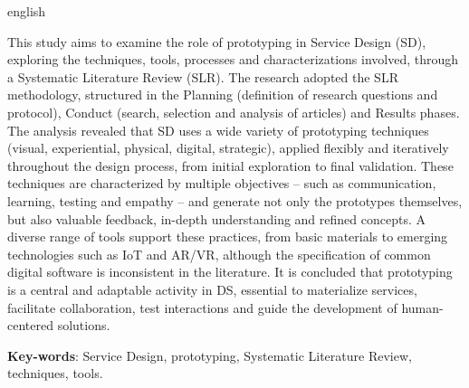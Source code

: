 \begin{resumo}[Abstract]
 \begin{otherlanguage*}{english}
 	
This study aims to examine the role of prototyping in Service Design (SD), exploring the techniques, tools, processes and characterizations involved, through a Systematic Literature Review (SLR). The research adopted the SLR methodology, structured in the Planning (definition of research questions and protocol), Conduct (search, selection and analysis of articles) and Results phases. The analysis revealed that SD uses a wide variety of prototyping techniques (visual, experiential, physical, digital, strategic), applied flexibly and iteratively throughout the design process, from initial exploration to final validation. These techniques are characterized by multiple objectives – such as communication, learning, testing and empathy – and generate not only the prototypes themselves, but also valuable feedback, in-depth understanding and refined concepts. A diverse range of tools support these practices, from basic materials to emerging technologies such as IoT and AR/VR, although the specification of common digital software is inconsistent in the literature. It is concluded that prototyping is a central and adaptable activity in DS, essential to materialize services, facilitate collaboration, test interactions and guide the development of human-centered solutions.

   \vspace{\onelineskip}
 
   \noindent 
   \textbf{Key-words}: Service Design, prototyping, Systematic Literature Review, techniques, tools.
 \end{otherlanguage*}
\end{resumo}
